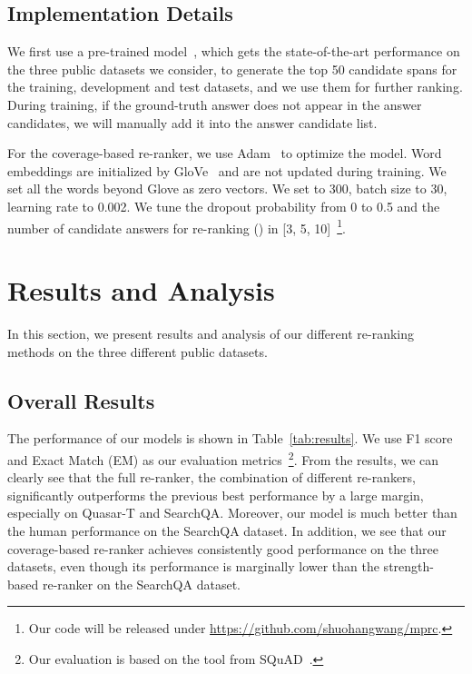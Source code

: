 \documentclass{article} \usepackage{iclr2018_conference,times}
\begin{document}
\subsection{Implementation Details}

We first use a pre-trained  model~\citep{wang2017r}, which gets the state-of-the-art performance on the three public datasets we consider, to generate the top 50 candidate spans for the training, development and test datasets, and we use them for further ranking. During training, if the ground-truth answer does not appear in the answer candidates, we will manually add it into the answer candidate list.

For the coverage-based re-ranker, we use Adam~\citep{kingma2014adam:iclr2015} to optimize the model. Word embeddings are initialized by  GloVe~\citep{glove:emnlp2014} and are not updated during training. We set all the words beyond Glove as zero vectors. We set  to 300, batch size to 30, learning rate to 0.002.  We tune the dropout probability from 0 to 0.5 and the number of candidate answers for re-ranking () in [3, 5, 10]~\footnote{Our code will be released under \url{https://github.com/shuohangwang/mprc}.}.




\section{Results and Analysis}

In this section, we present results and analysis of our different re-ranking methods on the three different public datasets.

\subsection{Overall Results}

The performance of our models is shown in Table~\ref{tab:results}. We use F1 score and Exact Match (EM) as our evaluation metrics~\footnote{Our evaluation is based on the tool from SQuAD~\citep{rajpurkar2016squad}.}.  
From the results, we can clearly see that the full re-ranker, the combination of different re-rankers, significantly outperforms the previous best performance by a large margin, especially on Quasar-T and SearchQA. Moreover, our model is much better than the human performance on the SearchQA dataset. In addition, we see that our coverage-based re-ranker achieves consistently good performance on the three datasets, even though its performance is marginally lower than the strength-based re-ranker on the SearchQA dataset.
\end{document}
